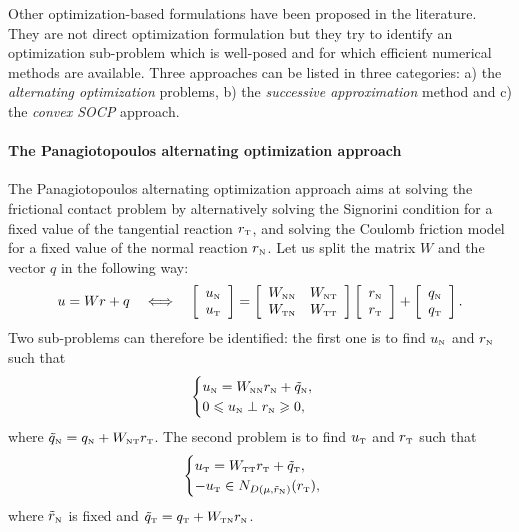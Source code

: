 {Other optimization-based formulations have been proposed in the literature. They are not direct optimization formulation but they try to identify an optimization sub-problem which is well-posed and for which efficient numerical methods are available. Three approaches can be listed in three categories: a)  the \emph{alternating optimization} problems, b) the \emph{successive approximation} method and c)  the \emph{convex SOCP} approach.


\paragraph{The Panagiotopoulos alternating optimization approach} The Panagiotopoulos alternating optimization approach aims at solving the frictional contact problem by alternatively solving the Signorini condition for a fixed value of the tangential reaction $r_{\hbox{\tiny{T}}}$, and solving the Coulomb friction model for a fixed value of the normal reaction $r_{\hbox{\tiny{N}}}$. 
Let us split the matrix $W$ and the vector $q$ in the following way:
\begin{equation}
  \label{eq:W-split}
  u = W r +q \quad \Longleftrightarrow \quad
  \left[\begin{array}{c}
    u_\n \\ u_\t
  \end{array}\right]
 =
  \left[\begin{array}{cc}
    W_{\n\n} &W_{\n\t} \\
    W_{\t\n} &W_{\t\t} \\    
  \end{array}\right]    \left[\begin{array}{c}
    r_\n\\ r_\t
  \end{array}\right]+
 \left[\begin{array}{c}
    q_\n \\q_\t
  \end{array}\right].
\end{equation}
Two sub-problems can therefore be identified: the first one is to find $u_{\hbox{\tiny{N}}}$ and $r_{\hbox{\tiny{N}}}$ such that
\begin{equation}
  \label{eq:AO-1}
  \begin{cases}
    u_\n = W_{\n\n} r_\n + \tilde q_\n, \\
    0\leq u_\n \perp r_\n \geq 0,
  \end{cases}
\end{equation}
where $\tilde q_{\hbox{\tiny{N}}} = q_{\hbox{\tiny{N}}} + W_{{\hbox{\tiny{N}}}{\hbox{\tiny{T}}}}r_{\hbox{\tiny{T}}}$. The second problem is to find $u_{\hbox{\tiny{T}}}$ and $r_{\hbox{\tiny{T}}}$ such that
\begin{equation}
  \label{eq:AO-2}
  \begin{cases}
    u_\t = W_{\t\t} r_\t + \tilde q_\t, \\
   -u_\t \in N_{D(\mu,\tilde r_{\n})}(r_\t),
  \end{cases}
\end{equation}
where $\tilde r_{\hbox{\tiny{N}}}$ is fixed and $\tilde q_{\hbox{\tiny{T}}} = q_{\hbox{\tiny{T}}} + W_{{\hbox{\tiny{T}}}{\hbox{\tiny{N}}}}r_{\hbox{\tiny{N}}}$.

}
